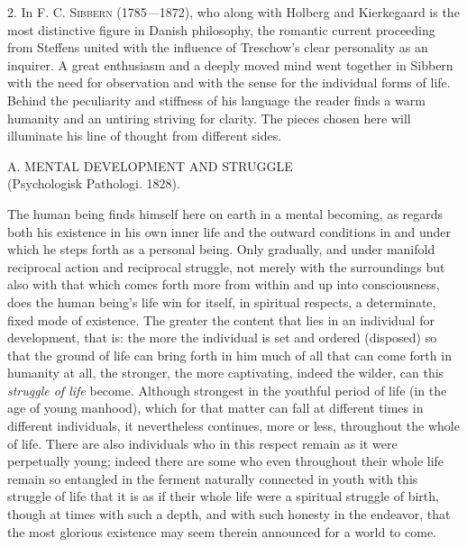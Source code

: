 \documentclass[12pt,a4paper,openany]{book}
\newcommand{\opage}[1]{\marginnote{\footnotesize\textit{[#1]}}}
\newcommand{\excerpthead}[1]{\par\bigskip\begin{center}#1\end{center}\nopagebreak\smallskip}
\newenvironment{intro}{\par}{\par}
\begin{document}
\begin{intro}

\setcounter{footnote}{0}%
\opage{114}2. In \textsc{F. C. Sibbern} (1785---1872), who along with Holberg and Kierkegaard is the most
distinctive figure in Danish philosophy, the romantic current proceeding from
Steffens united with the influence of Treschow's clear personality as an inquirer.
A great enthusiasm and a deeply moved mind went together in Sibbern with the need
for observation and with the sense for the individual forms of life. Behind the
peculiarity and stiffness of his language the reader finds a warm humanity and an
untiring striving for clarity. The pieces chosen here will illuminate his line of
thought from different sides.
\end{intro}

\excerpthead{A. MENTAL DEVELOPMENT AND STRUGGLE \\ (Psychologisk Pathologi. 1828).}


The human being finds himself here on earth in a mental becoming, as regards both
his existence in his own inner life and the outward conditions in and under which he
steps forth as a personal being. Only gradually, and under manifold reciprocal
action and reciprocal struggle, not merely with the surroundings but also with that
which comes forth more from within and up into consciousness, does the human
being's life win for itself, in spiritual respects, a determinate, fixed mode of
existence. The greater the content that lies in an individual for development, that
is: the more the individual is set and ordered (disposed) so that the ground of life
can bring forth in him much of all that can come forth in humanity at all, the
stronger, the more captivating, indeed the wilder, can this \emph{struggle of life}
become. Although strongest in the youthful period of life (in the age of young
manhood), which for that matter can fall at different times in different
individuals, it nevertheless continues, more or less, throughout the whole of life.
There are also individuals who in this respect remain as it were perpetually young;
indeed there are some who even throughout their whole life remain so entangled in
the ferment naturally connected in youth with this struggle of life that it is as if
their whole life were a spiritual struggle of birth, though at times with such a
depth, and with
\setcounter{footnote}{0}%
\opage{115}such honesty in the endeavor, that the most glorious existence may seem therein
announced for a world to come.
\end{document}
